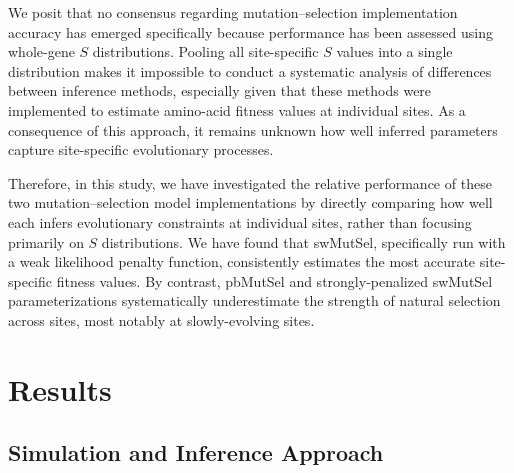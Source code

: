 \documentclass[11pt]{article}
\begin{document}
We posit that no consensus regarding mutation--selection implementation accuracy has emerged specifically because performance has been assessed using whole-gene $S$ distributions. Pooling all site-specific $S$ values into a single distribution makes it impossible to conduct a systematic analysis of differences between inference methods, especially given that these methods were implemented to estimate amino-acid fitness values at individual sites. As a consequence of this approach, it remains unknown how well inferred parameters capture site-specific evolutionary processes.

Therefore, in this study, we have investigated the relative performance of these two mutation--selection model implementations by directly comparing how well each infers evolutionary constraints at individual sites, rather than focusing primarily on $S$ distributions. We have found that swMutSel, specifically run with a weak likelihood penalty function, consistently estimates the most accurate site-specific fitness values. By contrast, pbMutSel and strongly-penalized swMutSel parameterizations systematically underestimate the strength of natural selection across sites, most notably at slowly-evolving sites.




\section*{Results}

\subsection*{Simulation and Inference Approach}
\end{document}
